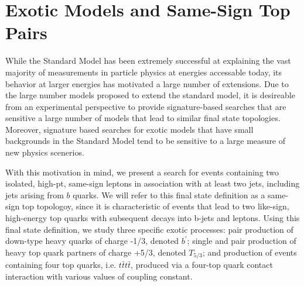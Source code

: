 
\chapter{Exotic Models and Same-Sign Top Pairs}


While the Standard Model has been extremely successful at explaining the vast majority of measurements in particle physics at energies accessable today, its behavior at larger energies has motivated a large number of extensions.
Due to the large number models proposed to extend the standard model, it is desireable from an experimental perspective to provide signature-based searches that are sensitive a large number of models that lead to similar final state topologies.
Moreover, signature based searches for exotic models that have small backgrounds in the Standard Model tend to be sensitive to a large measure of new physics scenerios.

With this motivation in mind, we present a search for events containing two isolated, high-pt, same-sign leptons in association with at least two jets, including jets arising from $b$ quarks. 
We will refer to this final state definition as a same-sign top topologoy, since it is characteristic of events that lead to two like-sign, high-energy top quarks with subsequent decays into b-jets and leptons.
Using this final state definition, we study three specific exotic processes: pair production of down-type heavy quarks of charge -1/3, denoted $b^\prime$; single and pair production of heavy top quark partners of charge +5/3, denoted $T_{5/3}$; and production of events containing four top quarks, i.e. $t\bar{t}t\bar{t}$, produced via a four-top quark contact interaction with various values of coupling constant.

